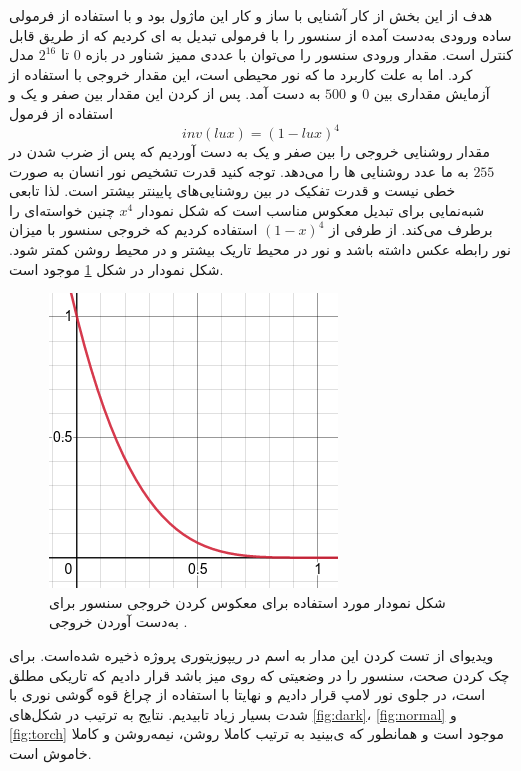 \documentclass[12pt,a4paper]{article}
\begin{document}
 

هدف از این بخش از کار آشنایی با ساز و کار این ماژول بود و با استفاده از فرمولی ساده ورودی به‌دست آمده از سنسور را با فرمولی تبدیل به 
ای کردیم که از طریق 
قابل کنترل است. مقدار ورودی سنسور را می‌توان با عددی ممیز شناور در بازه $0$ تا 
$2^16$
مدل کرد. اما به علت کاربرد ما که نور محیطی است، این مقدار خروجی با استفاده از آزمایش مقداری بین $0$ و 
$500$
به دست آمد. پس از 
کردن این مقدار بین صفر و یک و استفاده از فرمول
$$inv(lux) = (1 - lux)^4$$
مقدار روشنایی خروجی را بین صفر و یک به دست آوردیم که پس از ضرب شدن در 
$255$
به ما عدد روشنایی 
ها را می‌دهد. توجه کنید قدرت تشخیص نور انسان به صورت خطی نیست و قدرت تفکیک در بین روشنایی‌های پایینتر بیشتر است. لذا تابعی شبه‌نمایی برای تبدیل معکوس مناسب است که شکل نمودار 
$x^4$
چنین خواسته‌ای را برطرف می‌کند. از طرفی از 
$(1 - x)^4$
استفاده کردیم که خروجی سنسور با میزان نور رابطه عکس داشته باشد و نور در محیط تاریک بیشتر و در محیط روشن کمتر شود. شکل نمودار در شکل
\ref{fig:plot}
موجود است.
\begin{figure}[H]
	\centering
	\includegraphics[scale=0.6]{figs/inversion-formula-plot.png}
	\caption{
		شکل نمودار مورد استفاده برای معکوس کردن خروجی سنسور برای به‌دست آوردن خروجی 
		.
	}
	\label{fig:plot}
\end{figure}

ویدیو‌ای از تست کردن این مدار به اسم
در ریپوزیتوری پروژه ذخیره شده‌است. برای چک کردن صحت، سنسور را در وضعیتی که روی میز باشد قرار دادیم که تاریکی مطلق است، در جلوی نور لامپ قرار دادیم و نهایتا با استفاده از چراغ قوه گوشی نوری با شدت بسیار زیاد تابیدیم. نتایج به ترتیب در شکل‌های \ref{fig:dark}، \ref{fig:normal} و \ref{fig:torch} موجود است و همانطور که ی‌بینید به ترتیب کاملا روشن، نیمه‌روشن و کاملا خاموش است.
\end{document}
